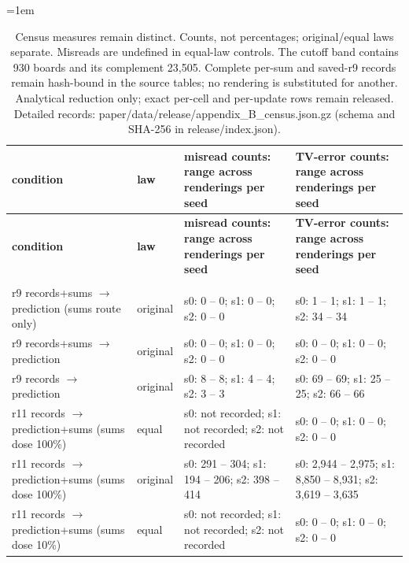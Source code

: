 \begingroup\fontsize{8}{9.5}\selectfont\setlength{\tabcolsep}{3pt}\emergencystretch=1em
\begin{longtable}{@{}>{\raggedright\arraybackslash}p{1.700in}>{\raggedright\arraybackslash}p{0.400in}>{\raggedright\arraybackslash}p{2.000in}>{\raggedright\arraybackslash}p{2.000in}@{}}
\caption{Census measures remain distinct. Counts, not percentages; original/\allowbreak{}equal laws separate. Misreads are undefined in equal-law controls. The cutoff band contains 930 boards and its complement 23,505. Complete per-sum and saved-r9 records remain hash-bound in the source tables; no rendering is substituted for another. Analytical reduction only; exact per-cell and per-update rows remain released. Detailed records: paper/\allowbreak{}data/\allowbreak{}release/\allowbreak{}appendix\_\allowbreak{}B\_\allowbreak{}census.json.gz (schema and SHA-256 in release/\allowbreak{}index.json).}\label{tab:appendix_B_census}\\
\toprule
\textbf{condition} & \textbf{law} & \textbf{misread counts: range across renderings per seed} & \textbf{TV-error counts: range across renderings per seed} \\
\midrule\endfirsthead
\toprule
\textbf{condition} & \textbf{law} & \textbf{misread counts: range across renderings per seed} & \textbf{TV-error counts: range across renderings per seed} \\
\midrule\endhead
\midrule\multicolumn{4}{r}{Continued on next page}\\\endfoot
\bottomrule\endlastfoot
r9 records+sums $\to$ prediction (sums route only) & original & s0: 0 -- 0; s1: 0 -- 0; s2: 0 -- 0 & s0: 1 -- 1; s1: 1 -- 1; s2: 34 -- 34 \\
r9 records+sums $\to$ prediction & original & s0: 0 -- 0; s1: 0 -- 0; s2: 0 -- 0 & s0: 0 -- 0; s1: 0 -- 0; s2: 0 -- 0 \\
r9 records $\to$ prediction & original & s0: 8 -- 8; s1: 4 -- 4; s2: 3 -- 3 & s0: 69 -- 69; s1: 25 -- 25; s2: 66 -- 66 \\
r11 records $\to$ prediction+sums (sums dose 100\%) & equal & s0: not recorded; s1: not recorded; s2: not recorded & s0: 0 -- 0; s1: 0 -- 0; s2: 0 -- 0 \\
r11 records $\to$ prediction+sums (sums dose 100\%) & original & s0: 291 -- 304; s1: 194 -- 206; s2: 398 -- 414 & s0: 2,944 -- 2,975; s1: 8,850 -- 8,931; s2: 3,619 -- 3,635 \\
r11 records $\to$ prediction+sums (sums dose 10\%) & equal & s0: not recorded; s1: not recorded; s2: not recorded & s0: 0 -- 0; s1: 0 -- 0; s2: 0 -- 0 \\

\end{longtable}
